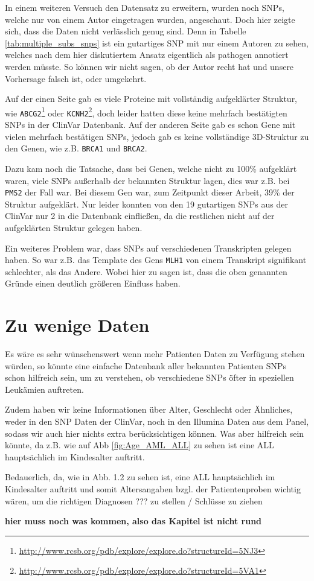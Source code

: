 In einem weiteren Versuch den Datensatz zu erweitern, wurden noch \ac{SNP}s, welche nur von einem Autor eingetragen wurden, angeschaut. Doch hier zeigte sich, dass die Daten nicht verlässlich genug sind. Denn in Tabelle \ref{tab:multiple_subs_snps} ist ein gutartiges \ac{SNP} mit nur einem Autoren zu sehen, welches nach dem hier diskutiertem Ansatz eigentlich als pathogen annotiert werden müsste. So können wir nicht sagen, ob der Autor recht hat und unsere Vorhersage falsch ist, oder umgekehrt.

Auf der einen Seite gab es viele Proteine mit vollständig aufgeklärter Struktur, wie \texttt{ABCG2}\footnote{\url{http://www.rcsb.org/pdb/explore/explore.do?structureId=5NJ3}} oder \texttt{KCNH2}\footnote{\url{http://www.rcsb.org/pdb/explore/explore.do?structureId=5VA1}}, doch leider hatten diese keine mehrfach bestätigten \ac{SNP}s in der ClinVar Datenbank. 
Auf der anderen Seite gab es schon Gene mit vielen mehrfach bestätigen \ac{SNP}s, jedoch gab es keine vollständige 3D-Struktur zu den Genen, wie z.B. \texttt{BRCA1} und \texttt{BRCA2}.

Dazu kam noch die Tatsache, dass bei Genen, welche nicht zu 100\% aufgeklärt waren, viele \ac{SNP}s außerhalb der bekannten Struktur lagen, dies war z.B. bei \texttt{PMS2} der Fall war. Bei diesem Gen war, zum Zeitpunkt dieser Arbeit, 39\% der Struktur aufgeklärt. Nur leider konnten von den 19 gutartigen \ac{SNP}s aus der ClinVar nur 2 in die Datenbank einfließen, da die restlichen nicht auf der aufgeklärten Struktur gelegen haben.

Ein weiteres Problem war, dass \ac{SNP}s auf verschiedenen Transkripten gelegen haben. So war z.B. das Template des Gens \texttt{MLH1} von einem Transkript signifikant schlechter, als das Andere. Wobei hier zu sagen ist, dass die oben genannten Gründe einen deutlich größeren Einfluss haben.



\section{Zu wenige Daten}

Es wäre es sehr wünschenswert wenn mehr Patienten Daten zu Verfügung stehen würden, so könnte eine einfache Datenbank aller bekannten Patienten \ac{SNP}s schon hilfreich sein, um zu verstehen, ob verschiedene \ac{SNP}s öfter in speziellen Leukämien auftreten.

Zudem haben wir keine Informationen über Alter, Geschlecht oder Ähnliches, weder in den SNP Daten der ClinVar, noch in den Illumina Daten aus dem Panel, sodass wir auch hier nichts extra berücksichtigen können. Was aber hilfreich sein könnte, da z.B. wie auf \ac{Abb} \ref{fig:Age_AML_ALL} zu sehen ist eine \ac{ALL} hauptsächlich im Kindesalter auftritt.

Bedauerlich, da, wie in Abb. 1.2 zu sehen ist, eine ALL hauptsächlich im Kindesalter auftritt und somit Altersangaben bzgl. der Patientenproben wichtig wären, um die richtigen Diagnosen ??? zu stellen / Schlüsse zu ziehen 

\textbf{hier muss noch was kommen, also das Kapitel ist nicht rund}

